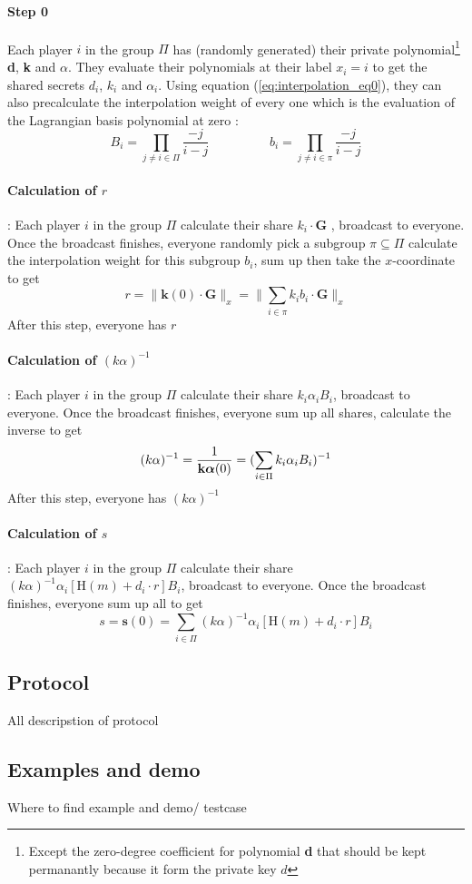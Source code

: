 \documentclass[a4paper,10pt]{article}
\begin{document}
\paragraph{Step 0} Each player $i$ in the group $\Pi$ has (randomly generated) their private polynomial\footnote{Except the zero-degree coefficient for polynomial \textbf{d} that should be kept permanantly because it form the private key $d$} \textbf{d}, \textbf{k} and {\boldmath$\alpha$}. They evaluate their polynomials at their label $x_i=i$ to get the shared secrets $d_i$, $k_i$ and $\alpha_i$. Using equation (\ref{eq:interpolation_eq0}), they can also precalculate the interpolation weight of every one which is the evaluation of the Lagrangian basis polynomial at zero : 
\[
B_{i} = \prod_{j \neq i \in \Pi}\frac{-j}{i - j}
\hspace{2cm}
b_{i} = \prod_{j \neq i \in \pi}\frac{-j}{i - j}
\]
\paragraph{Calculation of $r$} : Each player $i$ in the group $\Pi$ calculate  their share $k_i \cdot\textbf{G}$ , broadcast to everyone. Once the broadcast finishes, everyone randomly pick a subgroup $\pi\subseteq\Pi$ calculate the interpolation weight for this subgroup $b_i$, sum up then take the $x$-coordinate to get
\[
r=\|\textbf{k}(0)\cdot\textbf{G}\|_{x}=\|\sum_{i\in\pi} k_ib_i\cdot\textbf{G}\|_{x}
\]
After this step, everyone has $r$
\paragraph{Calculation of $(k\alpha)^{-1}$} : Each player $i$ in the group $\Pi$ calculate  their share $k_i\alpha_i B_i$, broadcast to everyone. Once the broadcast finishes, everyone sum up all shares, calculate the inverse to get 
\[
(k\alpha)^{-1} =\frac{1}{\textbf{k{\boldmath$\alpha$}}(0)}=(\sum_{i\in\Pi} k_i \alpha_i B_i)^{-1}
\]
After this step, everyone has $(k\alpha)^{-1}$
\paragraph{Calculation of $s$} : Each player $i$ in the group $\Pi$ calculate their share $(k\alpha)^{-1} \alpha_i [ \text{H}(m) + d_i \cdot r ]B_i$, broadcast to everyone. Once the broadcast finishes, everyone sum up all to get
\[
s=\textbf{s}(0)=\sum_{i\in\Pi}(k\alpha)^{-1} \alpha_i [ \text{H}(m) + d_i \cdot r ]B_i
\]
\subsection{Protocol}%
All descripstion of protocol
\subsection{Examples and demo}%
Where to find example and demo/ testcase
\end{document}

